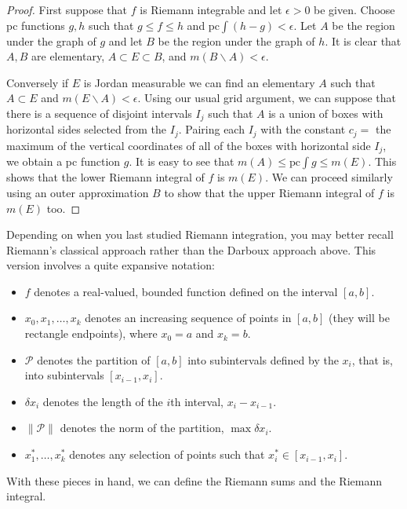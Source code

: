 \documentclass[11pt,oneside]{amsbook}
\renewcommand{\setminus}{\smallsetminus}
\theoremstyle{definition}
\theoremstyle{plain}
\theoremstyle{definition}
\theoremstyle{remark}
\numberwithin{equation}{section}
\numberwithin{figure}{section}
\begin{document}
\begin{proof}
  First suppose that $f$ is Riemann integrable and let $\epsilon>0$ be given. Choose pc functions $g,h$ such that $g\leq f\leq h$ and $\text{pc}\int(h-g)<\epsilon$. Let $A$ be the region under the graph of $g$ and let $B$ be the region under the graph of $h$. It is clear that $A,B$ are elementary, $A\subset E\subset B$, and $m(B\setminus A)<\epsilon$.

  Conversely if $E$ is Jordan measurable we can find an elementary $A$ such that $A\subset E$ and $m(E\setminus A)<\epsilon$. Using our usual grid argument, we can suppose that there is a sequence of disjoint intervals $I_j$ such that $A$ is a union of boxes with horizontal sides selected from the $I_j$. Pairing each $I_j$ with the constant $c_j=$ the maximum of the vertical coordinates of all of the boxes with horizontal side $I_j$, we obtain a pc function $g$. It is easy to see that $m(A)\leq \text{pc}\int g\leq m(E)$. This shows that the lower Riemann integral of $f$ is $m(E)$. We can proceed similarly using an outer approximation $B$ to show that the upper Riemann integral of $f$ is $m(E)$ too.
\end{proof}

Depending on when you last studied Riemann integration, you may better recall Riemann's classical approach rather than the Darboux approach above. This version involves a quite expansive notation:

\begin{itemize}
\item $f$ denotes a real-valued, bounded function defined on the interval $[a,b]$.
\item $x_0,x_1,\ldots,x_k$ denotes an increasing sequence of points in $[a,b]$ (they will be rectangle endpoints), where $x_0=a$ and $x_k=b$.
\item $\mathcal P$ denotes the partition of $[a,b]$ into subintervals defined by the $x_i$, that is, into subintervals $[x_{i-1},x_i]$.
\item $\delta x_i$ denotes the length of the $i$th interval, $x_i-x_{i-1}$.
\item $\|\mathcal P\|$ denotes the norm of the partition, $\max\delta x_i$.
\item $x_1^*,\ldots,x_k^*$ denotes any selection of points such that $x_i^*\in[x_{i-1},x_i]$.
\end{itemize}

With these pieces in hand, we can define the Riemann sums and the Riemann integral.
\end{document}
